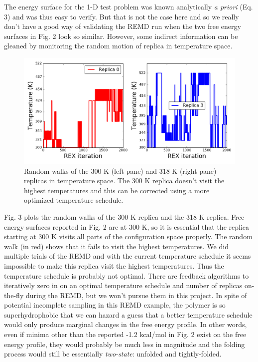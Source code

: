 \documentclass[12pt,letterpaper]{article}
\begin{document}
\noindent The energy surface for the 1-D test problem was known analytically \textit{a priori} (Eq. 3) and was thus easy to verify. But that is not the case here and so we really don't have a good way of validating the REMD run when the two free energy surfaces in Fig. 2 look so similar. However, some indirect information can be gleaned by monitoring the random motion of replica in temperature space.
%
\begin{figure}[h!]
\centering
\includegraphics[scale=0.5]{artwork/c60_wca_random_walk.png}
\caption{Random walks of the 300 K (left pane) and 318 K (right pane) replicas in temperature space. The 300 K replica doesn't visit the highest temperatures and this can be corrected using a more optimized temperature schedule.}
\end{figure}

\noindent Fig. 3 plots the random walks of the 300 K replica and the 318 K replica. Free energy surfaces reported in Fig. 2 are at 300 K, so it is essential that the replica starting at 300 K visits all parts of the configuration space properly. The random walk (in red) shows that it fails to visit the highest temperatures. We did multiple trials of the REMD and with the current temperature schedule it seems impossible to make this replica visit the highest temperatures. Thus the temperature schedule is probably not optimal. There are feedback algorithms to iteratively zero in on an optimal temperature schedule and number of replicas on-the-fly during the REMD, but we won't pursue them in this project. In spite of potential incomplete sampling in this REMD example, the polymer is so superhydrophobic that we can hazard a guess that a better temperature schedule would only produce marginal changes in the free energy profile. In other words, even if minima other than the reported -1.2 kcal/mol in Fig. 2 exist on the free energy profile, they would probably be much less in magnitude and the folding process would still be essentially \textit{two-state}: unfolded and tightly-folded.
\end{document}
